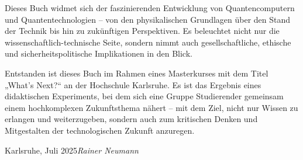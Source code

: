 Dieses Buch widmet sich der faszinierenden Entwicklung von Quantencomputern und Quantentechnologien – von den physikalischen Grundlagen über den Stand der Technik bis hin zu zukünftigen Perspektiven. Es beleuchtet nicht nur die wissenschaftlich-technische Seite, sondern nimmt auch gesellschaftliche, ethische und sicherheitspolitische Implikationen in den Blick.

Entstanden ist dieses Buch im Rahmen eines Masterkurses mit dem Titel „What’s Next?“ an der Hochschule Karlsruhe. Es ist das Ergebnis eines didaktischen Experiments, bei dem sich eine Gruppe Studierender gemeinsam einem hochkomplexen Zukunftsthema nähert – mit dem Ziel, nicht nur Wissen zu erlangen und weiterzugeben, sondern auch zum kritischen Denken und Mitgestalten der technologischen Zukunft anzuregen.

\vspace{\baselineskip}
\begin{flushright}\noindent
Karlsruhe, Juli 2025\hfill {\it Rainer Neumann}\\
\end{flushright}
